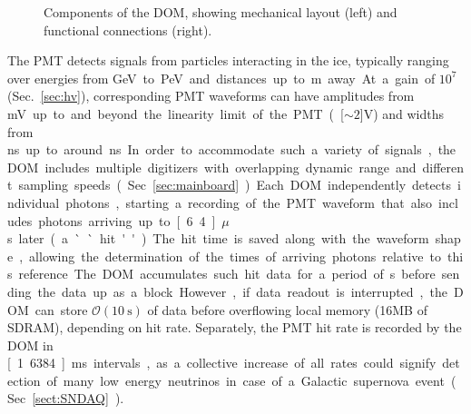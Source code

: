 \begin{figure}[!h]
  \captionsetup[subfigure]{labelformat=empty}
  \centering
  \caption{Components of the DOM, showing mechanical layout (left) and functional connections (right).}
  \label{fig:domcomponents}
\end{figure}



The PMT detects signals from particles interacting in the ice, typically ranging over
energies from \unit[10]GeV to \unit[10]PeV and distances up to \unit[500]m
away.  At a gain of $10^7$ (Sec.~\ref{sec:hv}), corresponding PMT waveforms can have amplitudes from \unit[1]mV up
to and beyond the linearity limit of the PMT (\unit[$\sim2$]V) and widths
from \unit[12]ns up to around \unit[1500]ns.  In order to accommodate such a variety
of signals, the DOM includes multiple digitizers with overlapping dynamic
range and different sampling speeds
(Sec.~\ref{sec:mainboard}).  Each DOM independently
detects individual photons, starting a recording of
the PMT waveform that also includes photons arriving up to
\unit[6.4]{$\mu$s} later (a ``hit'').  The hit time is saved along with the
waveform shape, allowing the determination of the times of arriving photons
relative to this reference.  The DOM accumulates such hit
data for a period of \unit[1]s before sending the data up as a block.
However, if data readout is interrupted, the DOM can store
$\mathcal{O}(\SI{10}{\second})$ of data before overflowing local memory
(16MB of SDRAM), depending on hit rate.  Separately, the PMT hit rate is recorded by
the DOM in \unit[1.6384]ms intervals, as a collective increase of all rates
could signify detection of many low energy neutrinos in case of a Galactic
supernova event (Sec.~\ref{sect:SNDAQ}).

